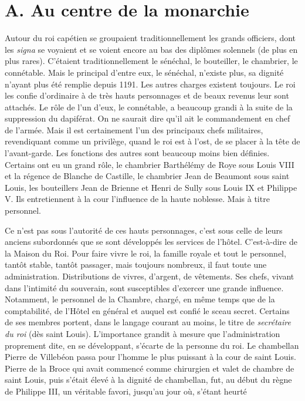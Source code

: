 \documentclass[french,twoside]{book} %
\begin{document}
\section[{A. Au centre de la monarchie}]{A. Au centre de la monarchie}
\label{c04a}
\noindent  {}
\label{p37} Autour du roi capétien se groupaient traditionnellement les grands officiers, dont les {\itshape signa} se voyaient et se voient encore au bas des diplômes solennels (de plus en plus rares). C’étaient traditionnellement le sénéchal, le bouteiller, le chambrier, le connétable. Mais le principal d’entre eux, le sénéchal, n’existe plus, sa dignité n’ayant plus été remplie depuis 1191. Les autres charges existent toujours. Le roi les confie d’ordinaire à de très hauts personnages et de beaux revenus leur sont attachés. Le rôle de l’un d’eux, le connétable, a beaucoup grandi à la suite de la suppression du dapiférat. On ne saurait dire qu’il ait le commandement en chef de l’armée. Mais il est certainement l’un des principaux chefs militaires, revendiquant comme un privilège, quand le roi est à l’ost, de se placer à la tête de l’avant-garde. Les fonctions des autres sont beaucoup moins bien définies. Certains ont eu un grand rôle, le chambrier Barthélémy de Roye sous Louis VIII et la régence de Blanche de Castille, le chambrier Jean de Beaumont sous saint Louis, les bouteillers Jean de Brienne et Henri de Sully sous Louis IX et Philippe V. Ils entretiennent à la cour l’influence de la haute noblesse. Mais à titre personnel.\par
Ce n’est pas sous l’autorité de ces hauts personnages, c’est sous celle de leurs anciens subordonnés que se sont développés les services de l’hôtel. C’est-à-dire de la Maison du Roi. Pour faire vivre le roi, la famille royale et tout le personnel, tantôt stable, tantôt passager, mais toujours nombreux, il faut toute une administration. Distributions de vivres, d’argent, de vêtements. Ses chefs, vivant dans l’intimité du souverain, sont susceptibles d’exercer une grande influence. Notamment, le personnel de la Chambre, chargé, en même temps que de la comptabilité, de l’Hôtel en général et auquel est confié le sceau secret. Certains de ses membres portent, dans le langage courant au moins, le titre de \emph{secrétaire du roi} (dès saint Louis). L’importance grandit à mesure que l’administration proprement dite, en se développant, s’écarte de la personne du roi. Le chambellan Pierre de Villebéon passa pour l’homme le plus puissant à la cour de saint Louis. Pierre de la Broce qui avait commencé comme chirurgien et valet de chambre de saint Louis, puis s’était élevé à la dignité de chambellan, fut, au début du règne de Philippe III, un véritable favori, jusqu’au jour où, s’étant heurté  
\end{document}
